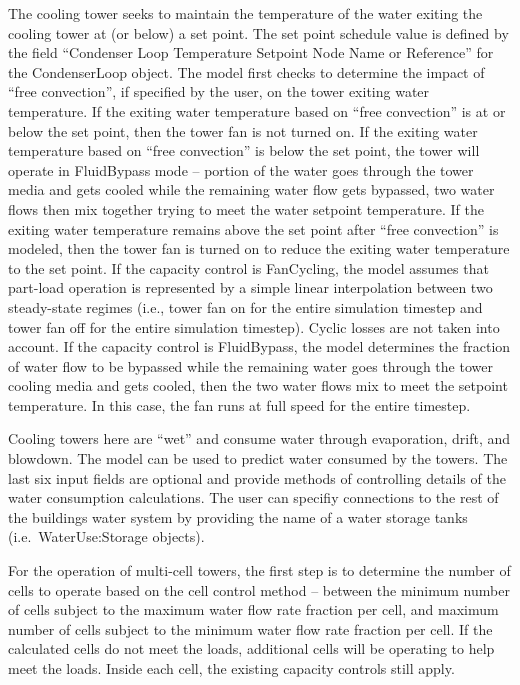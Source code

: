 The cooling tower seeks to maintain the temperature of the water exiting the cooling tower at (or below) a set point. The set point schedule value is defined by the field ``Condenser Loop Temperature Setpoint Node Name or Reference'' for the CondenserLoop object. The model first checks to determine the impact of ``free convection'', if specified by the user, on the tower exiting water temperature. If the exiting water temperature based on ``free convection'' is at or below the set point, then the tower fan is not turned on. If the exiting water temperature based on ``free convection'' is below the set point, the tower will operate in FluidBypass mode -- portion of the water goes through the tower media and gets cooled while the remaining water flow gets bypassed, two water flows then mix together trying to meet the water setpoint temperature. If the exiting water temperature remains above the set point after ``free convection'' is modeled, then the tower fan is turned on to reduce the exiting water temperature to the set point. If the capacity control is FanCycling, the model assumes that part-load operation is represented by a simple linear interpolation between two steady-state regimes (i.e., tower fan on for the entire simulation timestep and tower fan off for the entire simulation timestep). Cyclic losses are not taken into account. If the capacity control is FluidBypass, the model determines the fraction of water flow to be bypassed while the remaining water goes through the tower cooling media and gets cooled, then the two water flows mix to meet the setpoint temperature. In this case, the fan runs at full speed for the entire timestep.

Cooling towers here are ``wet'' and consume water through evaporation, drift, and blowdown. The model can be used to predict water consumed by the towers. The last six input fields are optional and provide methods of controlling details of the water consumption calculations. The user can specifiy connections to the rest of the buildings water system by providing the name of a water storage tanks (i.e.~WaterUse:Storage objects).

For the operation of multi-cell towers, the first step is to determine the number of cells to operate based on the cell control method -- between the minimum number of cells subject to the maximum water flow rate fraction per cell, and maximum number of cells subject to the minimum water flow rate fraction per cell. If the calculated cells do not meet the loads, additional cells will be operating to help meet the loads. Inside each cell, the existing capacity controls still apply.

